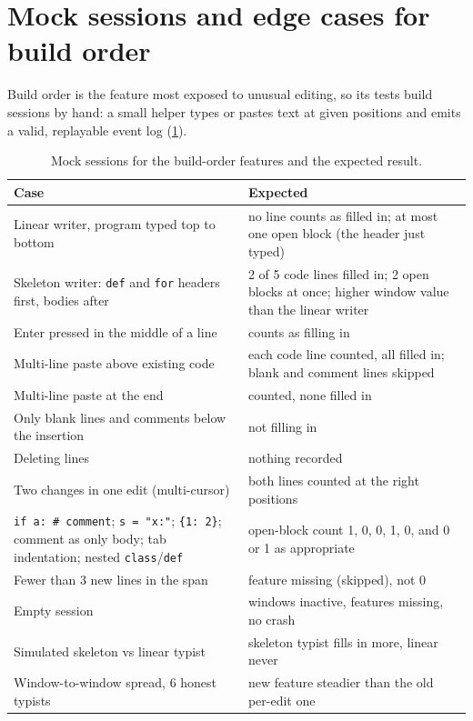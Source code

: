 \section{Mock sessions and edge cases for build order}
Build order is the feature most exposed to unusual editing, so its tests
build sessions by hand: a small helper types or pastes text at given
positions and emits a valid, replayable event log (\cref{tab:mock-cases}).

\begin{table}[ht]
  \centering\small
  \caption{Mock sessions for the build-order features and the expected result.}
  \label{tab:mock-cases}
  \begin{tabularx}{\linewidth}{@{}XX@{}}
    \toprule
    Case & Expected \\
    \midrule
    Linear writer, program typed top to bottom & no line counts as filled in; at most one open block (the header just typed) \\
    Skeleton writer: \texttt{def} and \texttt{for} headers first, bodies after & 2 of 5 code lines filled in; 2 open blocks at once; higher window value than the linear writer \\
    Enter pressed in the middle of a line & counts as filling in \\
    Multi-line paste above existing code & each code line counted, all filled in; blank and comment lines skipped \\
    Multi-line paste at the end & counted, none filled in \\
    Only blank lines and comments below the insertion & not filling in \\
    Deleting lines & nothing recorded \\
    Two changes in one edit (multi-cursor) & both lines counted at the right positions \\
    \texttt{if a:  \# comment}; \texttt{s = "x:"}; \texttt{\{1: 2\}}; comment as only body; tab indentation; nested \texttt{class}/\texttt{def} & open-block count 1, 0, 0, 1, 0, and 0 or 1 as appropriate \\
    Fewer than 3 new lines in the span & feature missing (skipped), not 0 \\
    Empty session & windows inactive, features missing, no crash \\
    Simulated skeleton vs linear typist & skeleton typist fills in more, linear never \\
    Window-to-window spread, 6 honest typists & new feature steadier than the old per-edit one \\
    \bottomrule
  \end{tabularx}
\end{table}

